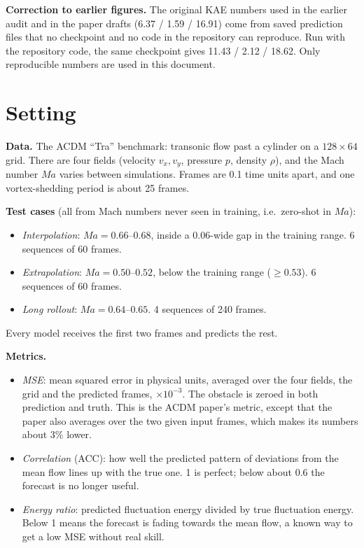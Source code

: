 \documentclass[10.5pt,a4paper]{article}
\newcommand{\callout}[1]{\par\smallskip\noindent\colorbox{note}{\parbox{\dimexpr\linewidth-2\fboxsep}{\small #1}}\par\smallskip}
\begin{document}
\callout{\textbf{Correction to earlier figures.} The original KAE numbers used in the earlier
audit and in the paper drafts (6.37 / 1.59 / 16.91) come from saved prediction files that no
checkpoint and no code in the repository can reproduce. Run with the repository code, the same
checkpoint gives 11.43 / 2.12 / 18.62. Only reproducible numbers are used in this document.}

\tableofcontents
\newpage

\section{Setting}\label{sec:setting}

\textbf{Data.} The ACDM ``Tra'' benchmark: transonic flow past a cylinder on a
$128\times64$ grid. There are four fields (velocity $v_x, v_y$, pressure $p$, density $\rho$),
and the Mach number $Ma$ varies between simulations. Frames are 0.1 time units apart, and one
vortex-shedding period is about 25 frames.

\textbf{Test cases} (all from Mach numbers never seen in training, i.e.\ zero-shot in $Ma$):
\begin{itemize}
\item \emph{Interpolation}: $Ma = 0.66$--$0.68$, inside a 0.06-wide gap in the training
  range. 6 sequences of 60 frames.
\item \emph{Extrapolation}: $Ma = 0.50$--$0.52$, below the training range ($\ge 0.53$).
  6 sequences of 60 frames.
\item \emph{Long rollout}: $Ma = 0.64$--$0.65$. 4 sequences of 240 frames.
\end{itemize}
Every model receives the first two frames and predicts the rest.

\textbf{Metrics.}
\begin{itemize}
\item \emph{MSE}: mean squared error in physical units, averaged over the four fields, the
  grid and the predicted frames, $\times10^{-3}$. The obstacle is zeroed in both prediction
  and truth. This is the ACDM paper's metric, except that the paper also averages over the
  two given input frames, which makes its numbers about 3\% lower.
\item \emph{Correlation} (ACC): how well the predicted pattern of deviations from the mean
  flow lines up with the true one. 1 is perfect; below about 0.6 the forecast is no longer
  useful.
\item \emph{Energy ratio}: predicted fluctuation energy divided by true fluctuation energy.
  Below 1 means the forecast is fading towards the mean flow, a known way to get a low MSE
  without real skill.
\end{itemize}
\end{document}
